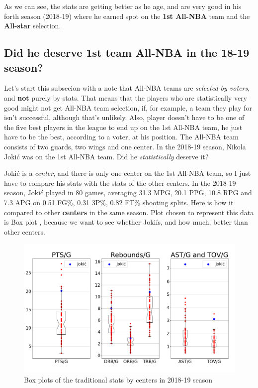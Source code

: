 \documentclass[a4paper]{article}
\begin{document}
As we can see, the stats are getting better as he age, and are very good in his forth season (2018-19) where he earned spot on the \textbf{1st All-NBA} team and the \textbf{All-star} selection.

\subsection{Did he deserve 1st team All-NBA in the 18-19 season?}
\label{subsec:jokic_all_nba}

Let's start this subsecion with a note that All-NBA teams are \textit{selected by voters}, and \textbf{not} purely by stats. That means that the players who are statistically very good might not get All-NBA team selection, if, for example, a team they play for isn't successful, although that's unlikely. Also, player doesn't have to be one of the five best players in the league to end up on the 1st All-NBA team, he just have to be the best, according to a voter, at his position. The All-NBA team consists of two guards, two wings and one center. In the 2018-19 season, Nikola Joki\' c was on the 1st All-NBA team. Did he \textit{statistically} deserve it?

Joki\' c is a \textit{center}, and there is only one center on the 1st All-NBA team, so I just have to compare his stats with the stats of the other centers. In the 2018-19 season, Joki\' c played in 80 games, averaging 31.3 MPG, 20.1 PPG, 10.8 RPG and 7.3 APG on 0.51 FG\%, 0.31 3P\%, 0.82 FT\% shooting splits. Here is how it compared to other \textbf{centers} in the same season. Plot chosen to represent this data is Box plot \cite{boxplots}, because we want to see whether Joki\' is, and how much, better than other centers.


\begin{figure}[h!]
\begin{center}
\includegraphics[scale=0.30]{centers_traditional.png}
\end{center}
\caption{Box plots of the traditional stats by centers in 2018-19 season}
\label{plt:centers_trad}
\end{figure}
\end{document}
